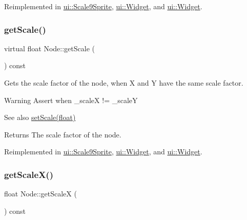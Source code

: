 Reimplemented in \hyperlink{classui_1_1Scale9Sprite_a83a48c3e969e9ae2d0d4bca560159bff}{ui\+::\+Scale9\+Sprite}, \hyperlink{classui_1_1Widget_a3decfabeeedb5fac08d9717f7c5421a3}{ui\+::\+Widget}, and \hyperlink{classui_1_1Widget_ac4806c4d8ba815b1bb2a8f100527ab7b}{ui\+::\+Widget}.

\mbox{\label{classNode_af8a6e8e0d7cc140bf3aa55b5898d8f5d}} 
\subsubsection{\texorpdfstring{get\+Scale()}{getScale()}\hspace{0.1cm}{\footnotesize\ttfamily [2/2]}}
{\footnotesize\ttfamily virtual float Node\+::get\+Scale (\begin{DoxyParamCaption}{ }\end{DoxyParamCaption}) const\hspace{0.3cm}{\ttfamily [virtual]}}

Gets the scale factor of the node, when X and Y have the same scale factor.

\begin{DoxyWarning}{Warning}
Assert when {\ttfamily \+\_\+scaleX != \+\_\+scaleY} 
\end{DoxyWarning}
\begin{DoxySeeAlso}{See also}
\hyperlink{classNode_acf0955a52f51a9d6c8b0c9267b1e8668}{set\+Scale(float)}
\end{DoxySeeAlso}
\begin{DoxyReturn}{Returns}
The scale factor of the node. 
\end{DoxyReturn}


Reimplemented in \hyperlink{classui_1_1Scale9Sprite_a83a48c3e969e9ae2d0d4bca560159bff}{ui\+::\+Scale9\+Sprite}, \hyperlink{classui_1_1Widget_a3decfabeeedb5fac08d9717f7c5421a3}{ui\+::\+Widget}, and \hyperlink{classui_1_1Widget_ac4806c4d8ba815b1bb2a8f100527ab7b}{ui\+::\+Widget}.

\mbox{\label{classNode_a27040ef8ab59ccf42b87d6ddc8d794e6}} 
\subsubsection{\texorpdfstring{get\+Scale\+X()}{getScaleX()}\hspace{0.1cm}{\footnotesize\ttfamily [1/2]}}
{\footnotesize\ttfamily float Node\+::get\+ScaleX (\begin{DoxyParamCaption}{ }\end{DoxyParamCaption}) const\hspace{0.3cm}{\ttfamily [virtual]}}



